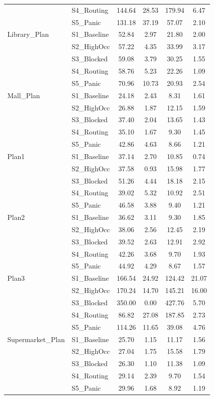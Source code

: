 \documentclass[journal]{IEEEtran}
\begin{document}
\begin{table}[t]
\begin{tabular}{llcccc}
 & S4\_Routing & 144.64 & 28.53 & 179.94 & 6.47 \\
 & S5\_Panic & 131.18 & 37.19 & 57.07 & 2.10 \\
\midrule
Library\_Plan & S1\_Baseline & 52.84 & 2.97 & 21.80 & 2.00 \\
 & S2\_HighOcc & 57.22 & 4.35 & 33.99 & 3.17 \\
 & S3\_Blocked & 59.08 & 3.79 & 30.25 & 1.55 \\
 & S4\_Routing & 58.76 & 5.23 & 22.26 & 1.09 \\
 & S5\_Panic & 70.96 & 10.73 & 20.93 & 2.54 \\
\midrule
Mall\_Plan & S1\_Baseline & 24.18 & 2.43 & 8.31 & 1.61 \\
 & S2\_HighOcc & 26.88 & 1.87 & 12.15 & 1.59 \\
 & S3\_Blocked & 37.40 & 2.04 & 13.65 & 1.43 \\
 & S4\_Routing & 35.10 & 1.67 & 9.30 & 1.45 \\
 & S5\_Panic & 42.86 & 4.63 & 8.66 & 1.21 \\
\midrule
Plan1 & S1\_Baseline & 37.14 & 2.70 & 10.85 & 0.74 \\
 & S2\_HighOcc & 37.58 & 0.93 & 15.98 & 1.77 \\
 & S3\_Blocked & 51.26 & 4.44 & 18.18 & 2.15 \\
 & S4\_Routing & 39.02 & 5.32 & 10.92 & 2.51 \\
 & S5\_Panic & 46.58 & 3.88 & 9.40 & 1.21 \\
\midrule
Plan2 & S1\_Baseline & 36.62 & 3.11 & 9.30 & 1.85 \\
 & S2\_HighOcc & 38.06 & 2.56 & 12.45 & 2.19 \\
 & S3\_Blocked & 39.52 & 2.63 & 12.91 & 2.92 \\
 & S4\_Routing & 42.26 & 3.68 & 9.70 & 1.93 \\
 & S5\_Panic & 44.92 & 4.29 & 8.67 & 1.57 \\
\midrule
Plan3 & S1\_Baseline & 166.54 & 24.92 & 124.42 & 21.07 \\
 & S2\_HighOcc & 170.24 & 14.70 & 145.21 & 16.00 \\
 & S3\_Blocked & 350.00 & 0.00 & 427.76 & 5.70 \\
 & S4\_Routing & 86.82 & 27.08 & 187.85 & 2.73 \\
 & S5\_Panic & 114.26 & 11.65 & 39.08 & 4.76 \\
\midrule
Supermarket\_Plan & S1\_Baseline & 25.70 & 1.15 & 11.17 & 1.56 \\
 & S2\_HighOcc & 27.04 & 1.75 & 15.58 & 1.79 \\
 & S3\_Blocked & 26.30 & 1.10 & 11.38 & 1.09 \\
 & S4\_Routing & 29.14 & 2.39 & 9.70 & 1.54 \\
 & S5\_Panic & 29.96 & 1.68 & 8.92 & 1.19 \\
\bottomrule
\end{tabular}
\end{table}
\end{document}
